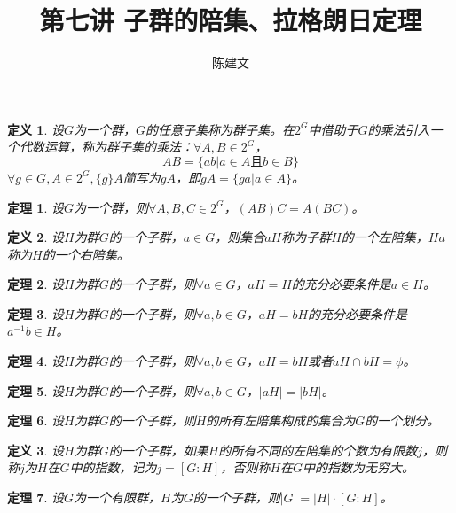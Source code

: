 \documentclass{article}
\newtheorem{Def}{定义}
\newtheorem{Thm}{定理}
\begin{document}
\begin{CJK*}{UTF8}{gbsn}
  \title{第七讲 子群的陪集、拉格朗日定理}
  \author{陈建文}
  \maketitle
  \begin{Def}
    设$G$为一个群，$G$的任意子集称为群子集。在$2^G$中借助于$G$的乘法引入一个代数运算，称为群子集的乘法：$\forall A,B\in 2^G$，
    \[AB=\{ab|a\in A \text{且} b\in B\}\]
    $\forall g\in G,A\in 2^G,\{g\}A$简写为$gA$，即$gA=\{ga|a\in A\}$。
  \end{Def}
  \begin{Thm}
    设$G$为一个群，则$\forall A,B,C\in 2^G$，$(AB)C=A(BC)$。
  \end{Thm}
\begin{Def}
  设$H$为群$G$的一个子群，$a\in G$，则集合$aH$称为子群$H$的一个左陪集，$Ha$称为$H$的一个右陪集。
\end{Def}

\begin{Thm}
  设$H$为群$G$的一个子群，则$\forall a\in G$，$aH=H$的充分必要条件是$a\in H$。
\end{Thm}
  
\begin{Thm}
  设$H$为群$G$的一个子群，则$\forall a,b\in G$，$aH=bH$的充分必要条件是$a^{-1}b\in H$。
\end{Thm}

\begin{Thm}
  设$H$为群$G$的一个子群，则$\forall a,b\in G$，$aH=bH$或者$aH\cap bH=\phi$。
\end{Thm}

\begin{Thm}
  设$H$为群$G$的一个子群，则$\forall a,b\in G$，$|aH|=|bH|$。
\end{Thm}

\begin{Thm}
  设$H$为群$G$的一个子群，则$H$的所有左陪集构成的集合为$G$的一个划分。
\end{Thm}

\begin{Def}
  设$H$为群$G$的一个子群，如果$H$的所有不同的左陪集的个数为有限数$j$，则称$j$为$H$在$G$中的指数，记为$j=[G:H]$，否则称$H$在$G$中的指数为无穷大。
\end{Def}

\begin{Thm}
 设$G$为一个有限群，$H$为$G$的一个子群，则$|G|=|H|\cdot [G:H]$。 
\end{Thm}


\end{CJK*}
\end{document}
